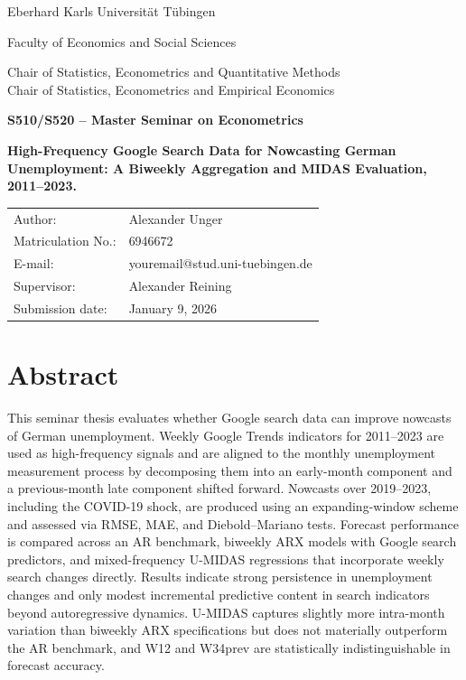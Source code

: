 \documentclass[12pt,a4paper]{article}
\makeatletter
\newcommand{\university}{Eberhard Karls Universität Tübingen}
\newcommand{\faculty}{Faculty of Economics and Social Sciences}
\newcommand{\seminar}{S510/S520 – Master Seminar on Econometrics}
\newcommand{\chairA}{Chair of Statistics, Econometrics and Quantitative Methods}
\newcommand{\chairB}{Chair of Statistics, Econometrics and Empirical Economics}
\newcommand{\supervisor}{Alexander Reining}
\newcommand{\authorname}{Alexander Unger}
\newcommand{\matricno}{6946672}
\newcommand{\emailaddr}{youremail@stud.uni-tuebingen.de}
\newcommand{\thesistitle}{High-Frequency Google Search Data for Nowcasting German Unemployment: A Biweekly Aggregation and MIDAS Evaluation, 2011–2023.}
\newcommand{\submissiondate}{January 9, 2026}
\makeatother
\begin{document}
\begin{titlepage}
  \centering
  {\large \university \par}
  \vspace{2mm}
  {\large \faculty \par}
  \vspace{18mm}
  {\large \chairA\\[2mm]\chairB\par}
  \vspace{18mm}
  {\Large \textbf{\seminar}\par}
  \vspace{18mm}
  {\LARGE \textbf{\thesistitle}\par}
  \vspace{18mm}
  \begin{tabular}{ll}
    Author:      & \authorname \\
    Matriculation No.: & \matricno \\
    E-mail:      & \emailaddr \\
    Supervisor:  & \supervisor \\
    Submission date: & \submissiondate \\
  \end{tabular}
  \vfill
\end{titlepage}



\section*{Abstract}
This seminar thesis evaluates whether Google search data can improve nowcasts of German unemployment. Weekly Google Trends indicators for 2011–2023 are used as high-frequency signals and are aligned to the monthly unemployment measurement process by decomposing them into an early-month component and a previous-month late component shifted forward. 
Nowcasts over 2019–2023, including the COVID-19 shock, are produced using an expanding-window scheme and assessed via RMSE, MAE, and Diebold–Mariano tests. Forecast performance is compared across an AR benchmark, biweekly ARX models with Google search predictors, and mixed-frequency U-MIDAS regressions that incorporate weekly search changes directly. Results indicate strong persistence in unemployment changes and only modest incremental predictive content in search indicators beyond autoregressive dynamics. U-MIDAS captures slightly more intra-month variation than biweekly ARX specifications but does not materially outperform the AR benchmark, and W12 and W34prev are statistically indistinguishable in forecast accuracy.
\newpage
\tableofcontents
\newpage
\listoffigures %
\newpage
\listoftables  %
\newpage
\end{document}
